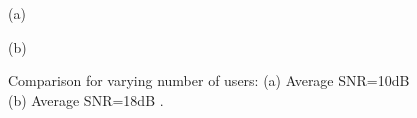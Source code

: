 \documentclass[11pt] {article}
\begin{document}
\begin{figure}[htb!]
\begin{center}
\centerline{}
\centerline{\small (a)}
\centerline{}
\centerline{\small (b)}
\caption{Comparison for varying number of users: (a) Average SNR=10dB (b) Average SNR=18dB .}
\label{fig_plotcompnew}
\end{center}
\end{figure}
\end{document}
